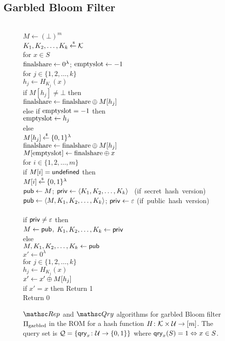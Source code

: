 \subsection{Garbled Bloom Filter}
\begin{figure}
\centering
{}
{
\\
$M \gets (\bot)^m$\\
$K_1,K_2,\ldots, K_k {\:\stackrel{{\scriptscriptstyle \hspace{0.2em}\$}} {\leftarrow}\:} {\cal K}$\\
for $x \in S$\\
\nudge $\mathrm{finalshare} \gets 0^\lambda$; $\mathrm{emptyslot} \gets -1$\\
\nudge for $j \in \{1,2,\ldots, k\}$\\
\nudge \nudge $h_j \gets H_{K_j}(x)$\\
\nudge \nudge if $M[h_j] \neq \bot$ then\\
\nudge \nudge \nudge $\mathrm{finalshare} \gets \mathrm{finalshare} {\:\oplus\:} M[h_j]$\\
\nudge \nudge else if $\mathrm{emptyslot} = -1$ then\\
\nudge \nudge \nudge $\mathrm{emptyslot} \gets h_j$\\
\nudge \nudge else\\
\nudge \nudge \nudge $M[h_j] {\:\stackrel{{\scriptscriptstyle \hspace{0.2em}\$}} {\leftarrow}\:} \{0,1\}^\lambda$\\
\nudge \nudge \nudge $\mathrm{finalshare} \gets \mathrm{finalshare} {\:\oplus\:} M[h_j]$\\
\nudge $M[\mathrm{emptyslot}] \gets \mathrm{finalshare} {\:\oplus\:} x$\\
for $i \in \{1,2,\ldots, m\}$\\
\nudge if $M[i] = \mathsf{undefined}$ then\\
\nudge \nudge  $M[i] {\:\stackrel{{\scriptscriptstyle \hspace{0.2em}\$}} {\leftarrow}\:} \{0,1\}^\lambda$\\
${\sf pub} \gets M$; ${\sf priv} \gets \langle K_1,K_2,\ldots,K_k \rangle$ \mbox{ (if secret hash version)}\\
${\sf pub} \gets \langle M,K_1,K_2,\ldots,K_k \rangle$; ${\sf priv} \gets \varepsilon$ \mbox{(if public hash version)}\\

\medskip
{}\\
if ${\sf priv} \neq \varepsilon$ then\\
\nudge $M \gets {\sf pub}$, $K_1,K_2,\ldots,K_k \gets {\sf priv}$\\
else\\
\nudge $M,K_1,K_2,\ldots,K_k \gets {\sf pub}$\\
$x' \gets 0^\lambda$\\
for $j \in \{1,2,\dots,k\}$\\
\nudge $h_j \gets H_{K_j}(x)$\\
\nudge $x' \gets x' {\:\oplus\:} M[h_j]$\\
if $x' =x $ then Return 1\\
Return 0
}
\caption{ $\Rep$ and $\Qry$ algorithms for garbled Bloom
  filter $\Pi_{\mathrm{garbled}}$ in the ROM for a hash function $H\colon {\cal K} \times 
 {\cal U} \to [m]$. The query set is ${\cal Q}=\{\mathsf{qry}_x\colon
  {\cal U} \to \{0,1\}\}$ where $\mathsf{qry}_x(S)=1 \Leftrightarrow x \in S$.}

\end{figure}


